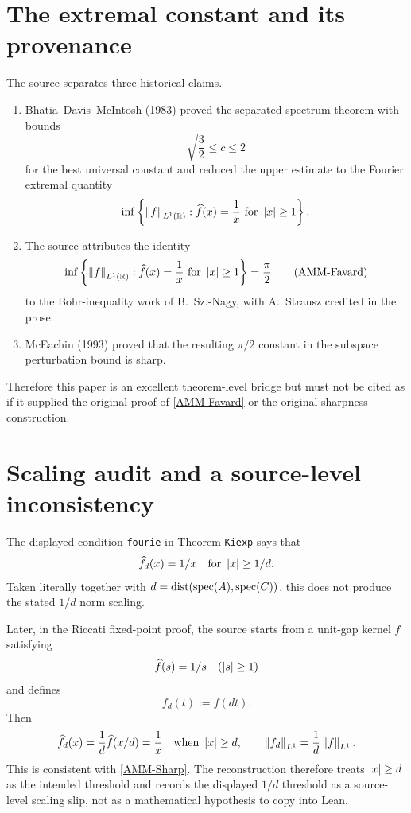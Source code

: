 \section{The extremal constant and its provenance}


The source separates three historical claims.

\begin{enumerate}[leftmargin=2em]
\item Bhatia--Davis--McIntosh (1983) proved the separated-spectrum theorem with bounds
\[
  \sqrt{\frac32}\le c\le 2
\]
for the best universal constant and reduced the upper estimate to the Fourier extremal quantity
\[
  \inf\left\{\left\lVert f\right\rVert_{L^1(\mathbb{R})}:
    \widehat f(x)=\frac1x\text{ for }\left\lvert x\right\rvert\ge1\right\}.
\]
\item The source attributes the identity
\begin{equation}
  \inf\left\{\left\lVert f\right\rVert_{L^1(\mathbb{R})}:
    \widehat f(x)=\frac1x\text{ for }\left\lvert x\right\rvert\ge1\right\}
  =\frac\pi2
  \tag{AMM-Favard}
\end{equation}
to the Bohr-inequality work of B.~Sz.-Nagy, with A.~Strausz credited in the prose.
\item McEachin (1993) proved that the resulting $\pi/2$ constant in the subspace perturbation bound is sharp.
\end{enumerate}

Therefore this paper is an excellent theorem-level bridge but must not be cited as if it supplied the original proof of \eqref{AMM-Favard} or the original sharpness construction.

\section{Scaling audit and a source-level inconsistency}

The displayed condition \texttt{fourie} in Theorem \texttt{Kiexp} says that
\[
  \widehat f_d(x)=1/x\quad\text{for }\left\lvert x\right\rvert\ge 1/d.
\]
Taken literally together with $d=\operatorname{dist}(\operatorname{spec}(A),\operatorname{spec}(C))$, this does not produce the stated $1/d$ norm scaling.

Later, in the Riccati fixed-point proof, the source starts from a unit-gap kernel $f$ satisfying
\[
  \widehat f(s)=1/s\quad(\left\lvert s\right\rvert\ge1)
\]
and defines
\[
  f_d(t):=f(dt).
\]
Then
\[
  \widehat f_d(x)=\frac1d\widehat f(x/d)=\frac1x
  \quad\text{when }\left\lvert x\right\rvert\ge d,
  \qquad
  \left\lVert f_d\right\rVert_{L^1}=\frac1d\left\lVert f\right\rVert_{L^1}.
\]
This is consistent with \eqref{AMM-Sharp}. The reconstruction therefore treats $\left\lvert x\right\rvert\ge d$ as the intended threshold and records the displayed $1/d$ threshold as a source-level scaling slip, not as a mathematical hypothesis to copy into Lean.

